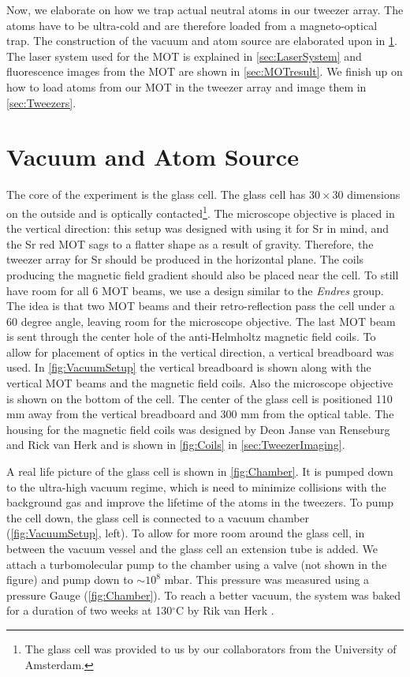 Now, we elaborate on how we trap actual neutral atoms in our tweezer array. 
The atoms have to be ultra-cold and are therefore loaded from a magneto-optical trap. 
The construction of the vacuum and atom source are elaborated upon in \cref{sec:VacuumAtom}.
The laser system used for the MOT is explained in \cref{sec:LaserSystem} and fluorescence images from the MOT are shown in \cref{sec:MOTresult}.
We finish up on how to load atoms from our MOT in the tweezer array and image them in \cref{sec:Tweezers}.

\section{Vacuum and Atom Source}\label{sec:VacuumAtom}

The core of the experiment is the glass cell.
The glass cell has $30\times30$ dimensions on the outside and is optically contacted\footnote{The glass cell was provided to us by our collaborators from the University of Amsterdam.}.
The microscope objective is placed in the vertical direction: this setup was designed with using it for Sr in mind, and the Sr red MOT sags to a flatter shape as a result of gravity. 
Therefore, the tweezer array for Sr should be produced in the horizontal plane. 
The coils producing the magnetic field gradient should also be placed near the cell. 
To still have room for all 6 MOT beams, we use a design similar to the \textit{Endres} group.
The idea is that two MOT beams and their retro-reflection pass the cell under a 60 degree angle, leaving room for the microscope objective. 
The last MOT beam is sent through the center hole of the anti-Helmholtz magnetic field coils.
To allow for placement of optics in the vertical direction, a vertical breadboard was used. 
In \cref{fig:VacuumSetup} the vertical breadboard is shown along with the vertical MOT beams and the magnetic field coils. 
Also the microscope objective is shown on the bottom of the cell.
The center of the glass cell is positioned 110 mm away from the vertical breadboard and 300 mm from the optical table. 
The housing for the magnetic field coils was designed by Deon Janse van Renseburg and Rick van Herk and is shown in \cref{fig:Coils} in \cref{sec:TweezerImaging}.

A real life picture of the glass cell is shown in \cref{fig:Chamber}.
It is pumped down to the ultra-high vacuum regime, which is need to minimize collisions with the background gas and improve the lifetime of the atoms in the tweezers.
To pump the cell down, the glass cell is connected to a vacuum chamber (\cref{fig:VacuumSetup}, left).
To allow for more room around the glass cell, in between the vacuum vessel and the glass cell an extension tube is added.
We attach a turbomolecular pump to the chamber using a valve (not shown in the figure) and pump down to $\sim 10^{8}$ mbar.
This pressure was measured using a pressure Gauge (\cref{fig:Chamber}).
To reach a better vacuum, the system was baked for a duration of two weeks at 130${}^{\circ}$C by Rik van Herk \cite{Herk2022}.

